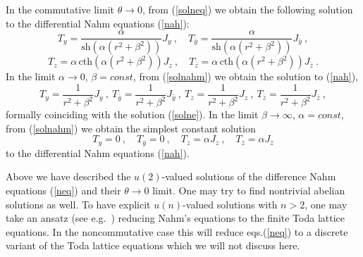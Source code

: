 \documentclass[a4paper,11pt]{article}
\numberwithin{equation}{section}
\def\th{\theta}
\def\a{\alpha}
\def\b{\beta}
\newcommand{\sh}{\mathrm{sh}}
\newcommand{\cth}{\mathrm{cth}}
\begin{document}
In the commutative limit $\th\to 0$, from (\ref{solneq}) we  obtain 
the following solution to the differential Nahm equations (\ref{nah}):
$$
T_y=\frac{\a}{\sh(\a (r^2 + \b^2 ))}J_y\ , \quad
T_{\bar y}= \frac{\a}{\sh(\a (r^2 +\b^2 ))} J_{\bar y} \ ,
$$
\begin{equation}
T_z=\a\, \cth (\a (r^2 +\b^2 )) J_z\ , \quad
T_{\bar z}= \a\, \cth (\a (r^2 +\b^2 ))J_{\bar z}\ .
\label{solnahm}
\end{equation}
In the limit $\a\to 0$, $\b =const$, from (\ref{solnahm}) we obtain  the solution
to (\ref{nah}),
\begin{equation}
T_y=\frac{1}{r^2 + \b^2 }J_y\ , \
T_{\bar y}= \frac{1}{r^2 +\b^2} J_{\bar y} \ ,\
T_z=\frac{1}{r^2 +\b^2} J_z\ , \
T_{\bar z}= \frac{1}{r^2 +\b^2 }J_{\bar z}\ ,
\label{sonahm}
\end{equation}
formally coinciding with the solution (\ref{solne}).
In the limit $\b\to \infty$, $\a =const$, from (\ref{solnahm}) we obtain 
the simplest constant solution
\begin{equation}
T_y=0\ , \quad
T_{\bar y}= 0 \ ,\quad
T_z= \a J_z\ , \quad
T_{\bar z}= \a J_{\bar z}
\label{snahm}
\end{equation}
 to the differential Nahm equations (\ref{nah}).

Above we have described the $u(2)$-valued solutions of the difference Nahm equations (\ref{neq})
and their $\th\to 0$ limit. One may try to find nontrivial abelian solutions as well.
To have explicit $u(n)$-valued solutions with $n>2$, one may take an ansatz (see 
e.g.~\cite{Ivanova:tu, Popov:bf}) reducing Nahm's equations to the finite
Toda lattice equations. In the noncommutative case this will reduce eqs.(\ref{neq})
to a discrete variant of the Toda lattice equations which we will not discuss here. 


\medskip
\end{document}
